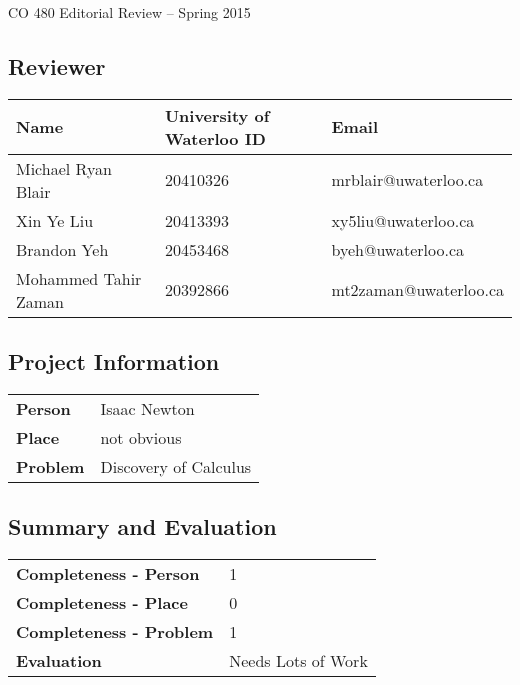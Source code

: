\documentclass[11pt]{article}
\begin{document}
\begin{center}
{\Large CO 480 Editorial Review -- Spring 2015} 
\end{center}

\subsection*{Reviewer} %
\begin{tabular}{|l|l|l|} \hline
\textbf{Name} & \textbf{University of Waterloo ID} & \textbf{Email} \\ \hline
Michael Ryan Blair & 20410326 & mrblair@uwaterloo.ca \\ \hline
Xin Ye Liu & 20413393 & xy5liu@uwaterloo.ca\\ \hline
Brandon Yeh & 20453468 & byeh@uwaterloo.ca\\ \hline
Mohammed Tahir Zaman & 20392866 & mt2zaman@uwaterloo.ca\\ \hline
\end{tabular}

\subsection*{Project Information} %
\begin{tabular}{ll}
{\bf Person}  & Isaac Newton \\
{\bf Place}   & not obvious \\
{\bf Problem} & Discovery of Calculus \\
\end{tabular}

\subsection*{Summary and Evaluation}

\begin{tabular}{ll}
{\bf Completeness - Person}  & 1 \\
{\bf Completeness - Place}   & 0 \\
{\bf Completeness - Problem} & 1 \\
{\bf Evaluation}             & Needs Lots of Work \\
\end{tabular}\\
\end{document}
